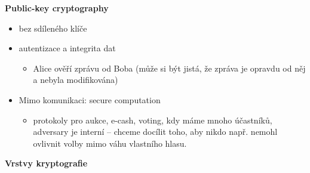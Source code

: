 \documentclass[a4paper,12pt,titlepage]{article}
\def\podnadpis#1{{\bigskip\bf\noindent#1\medskip\par}}
\begin{document}
\podnadpis{Public-key cryptography}

\begin{itemize}

\item bez sdíleného klíče

\item autentizace a integrita dat

\begin{itemize}

\item Alice ověří zprávu od Boba (může si být jistá, že zpráva je opravdu od
něj a nebyla modifikována)

\end{itemize}

\item Mimo komunikaci: secure computation

\begin{itemize}

\item protokoly pro aukce, e-cash, voting, kdy máme mnoho účastníků, adversary
je interní -- chceme docílit toho, aby nikdo např. nemohl ovlivnit volby mimo
váhu vlastního hlasu.

\end{itemize}

\end{itemize}

\podnadpis{Vrstvy kryptografie}
\end{document}
